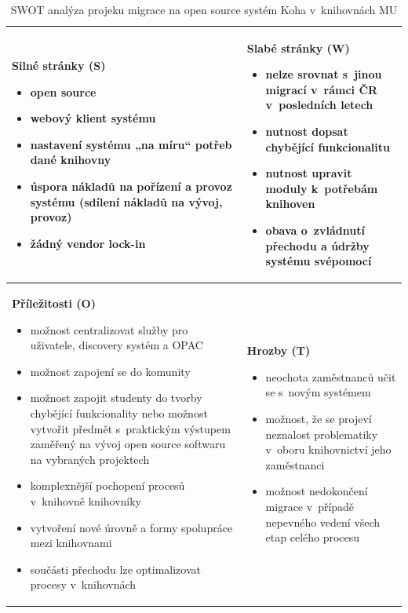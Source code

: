 \documentclass[
	11pt, oneside, printed, final, palatino, monochrome
	microtype,
	table,   %
	lof,     %
	lot     %
]{fithesis3}
\newcommand{\bold}[1]{\textbf{#1}}
\begin{document}
{\begin{table}
    \centering
    \begin{tabular}{ p{5.8cm} | p{5.8cm} }
    \bold{Silné stránky (S)} 
    \begin{itemize}
		\item open source
		\item webový klient systému
		\item nastavení systému „na míru“ potřeb dané knihovny
		\item úspora nákladů na pořízení a provoz systému (sdílení nákladů na vývoj, provoz)
		\item žádný vendor lock-in
	\end{itemize}
    & 
    \bold{Slabé stránky (W)} 
    \begin{itemize}
		\item nelze srovnat s~jinou migrací v~rámci ČR v~posledních letech
		\item nutnost dopsat chybějící funkcionalitu
		\item nutnost upravit moduly k~potřebám knihoven
		\item obava o~zvládnutí přechodu a údržby systému svépomocí
	\end{itemize}
    \\ \hline
    
    \bold{Příležitosti (O)} 
    \begin{itemize}
		\item možnost centralizovat služby pro uživatele, discovery systém a OPAC
		\item možnost zapojení se do komunity
		\item možnost zapojit studenty do tvorby chybějící funkcionality nebo možnost vytvořit předmět s~praktickým výstupem zaměřený na vývoj open source softwaru na vybraných projektech
		\item komplexnější pochopení procesů v~knihovně knihovníky
		\item vytvoření nové úrovně a formy spolupráce mezi knihovnami
		\item součásti přechodu lze optimalizovat procesy v~knihovnách
	\end{itemize}
    & 
    \bold{Hrozby (T)} 
    \begin{itemize}
		\item neochota zaměstnanců učit se s~novým systémem
		\item možnost, že se projeví neznalost problematiky v~oboru knihovnictví jeho zaměstnanci
		\item možnost nedokončení migrace v~případě nepevného vedení všech etap celého procesu
	\end{itemize}
    \end{tabular}
    \caption{SWOT analýza projeku migrace na open source systém Koha v~knihovnách MU}
\end{table}

}
\end{document}

